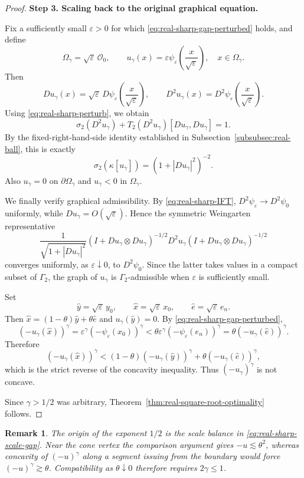 \documentclass{article}
\newtheorem{remark}[theorem]{Remark}
\numberwithin{equation}{section}
\begin{document}
\begin{proof}
\medskip
\noindent\textbf{Step 3. Scaling back to the original graphical
equation.}

Fix a sufficiently small $\varepsilon>0$ for which
\eqref{eq:real-sharp-gap-perturbed} holds, and define
\[
\Omega_\gamma
=
\sqrt{\varepsilon}\,\mathcal O_0,
\qquad
u_\gamma(x)
=
\varepsilon
\psi_\varepsilon
\left(
\frac{x}{\sqrt{\varepsilon}}
\right),
\quad x\in\Omega_\gamma.
\]
Then
\[
Du_\gamma(x)
=
\sqrt{\varepsilon}\,
D\psi_\varepsilon
\left(
\frac{x}{\sqrt{\varepsilon}}
\right),
\qquad
D^2u_\gamma(x)
=
D^2\psi_\varepsilon
\left(
\frac{x}{\sqrt{\varepsilon}}
\right).
\]
Using \eqref{eq:real-sharp-perturb}, we obtain
\[
\sigma_2(D^2u_\gamma)
+
T_2(D^2u_\gamma)[Du_\gamma,Du_\gamma]
=1.
\]
By the fixed-right-hand-side identity established in
Subsection~\ref{subsubsec:real-ball}, this is exactly
\[
\sigma_2(\kappa[u_\gamma])
=
(1+|Du_\gamma|^2)^{-2}.
\]
Also $u_\gamma=0$ on $\partial\Omega_\gamma$ and
$u_\gamma<0$ in $\Omega_\gamma$.

We finally verify graphical admissibility. By
\eqref{eq:real-sharp-IFT},
$D^2\psi_\varepsilon\to D^2\psi_0$ uniformly, while
$Du_\gamma=O(\sqrt{\varepsilon})$. Hence the symmetric Weingarten
representative
\[
\frac{1}{\sqrt{1+|Du_\gamma|^2}}
(I+Du_\gamma\otimes Du_\gamma)^{-1/2}
D^2u_\gamma
(I+Du_\gamma\otimes Du_\gamma)^{-1/2}
\]
converges uniformly, as $\varepsilon\downarrow0$, to
$D^2\psi_0$. Since the latter takes values in a compact subset of
$\Gamma_2$, the graph of $u_\gamma$ is $\Gamma_2$-admissible when
$\varepsilon$ is sufficiently small.

Set
\[
\widehat y=\sqrt{\varepsilon}\,y_0,
\qquad
\widehat x=\sqrt{\varepsilon}\,x_0,
\qquad
\widehat e=\sqrt{\varepsilon}\,e_n.
\]
Then
$\widehat x=(1-\theta)\widehat y+\theta\widehat e$ and
$u_\gamma(\widehat y)=0$. By
\eqref{eq:real-sharp-gap-perturbed},
\[
(-u_\gamma(\widehat x))^\gamma
=
\varepsilon^\gamma
(-\psi_\varepsilon(x_0))^\gamma
<
\theta\varepsilon^\gamma
(-\psi_\varepsilon(e_n))^\gamma
=
\theta(-u_\gamma(\widehat e))^\gamma.
\]
Therefore
\[
(-u_\gamma(\widehat x))^\gamma
<
(1-\theta)(-u_\gamma(\widehat y))^\gamma
+
\theta(-u_\gamma(\widehat e))^\gamma,
\]
which is the strict reverse of the concavity inequality.
Thus $(-u_\gamma)^\gamma$ is not concave.

Since $\gamma>1/2$ was arbitrary,
Theorem~\ref{thm:real-square-root-optimality} follows.
\end{proof}

\begin{remark}
\label{rem:real-square-root-scaling}
The origin of the exponent $1/2$ is the scale balance in
\eqref{eq:real-sharp-scale-gap}. Near the cone vertex the comparison
argument gives $-u\lesssim\theta^2$, whereas concavity of
$(-u)^\gamma$ along a segment issuing from the boundary would force
$(-u)^\gamma\gtrsim\theta$. Compatibility as $\theta\downarrow0$
therefore requires $2\gamma\le1$.
\end{remark}
\end{document}
